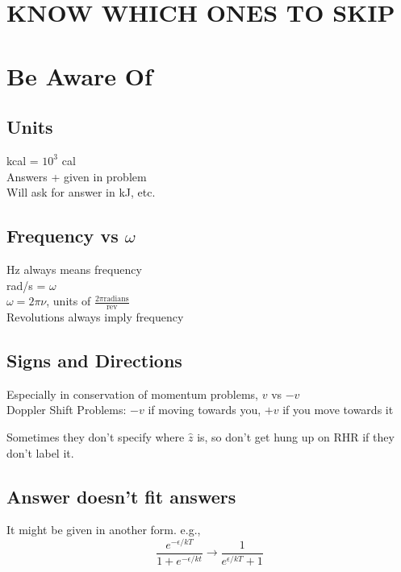 \documentclass[10pt,letter]{article}
\begin{document}
\section{KNOW WHICH ONES TO SKIP} %
\label{sec:know_which_ones_to_skip}

\section{Be Aware Of} %
\label{sec:units_to_be_aware_of}
\subsection{Units} %
\label{sub:units}
kcal = $10^3$ cal\\
Answers + given in problem\\
Will ask for answer in kJ, etc.

\subsection{Frequency vs $\omega$} %
\label{sub:freq}
Hz always means frequency\\
rad/s = $\omega$\\
$\omega = 2 \pi \nu$, units of $\frac{2\pi \textrm{radians} }{\textrm{rev}}$\\
Revolutions always imply frequency

\subsection{Signs and Directions} %
\label{sub:signs_and_directions}
Especially in conservation of momentum problems, $v$ vs $-v$\\
Doppler Shift Problems: $-v$ if moving towards you, $+v$ if you move towards it


Sometimes they don't specify where $\hat{z}$ is, so don't get hung up on RHR if they don't label it.\\
\subsection{Answer doesn't fit answers} %
\label{sub:answer_doesn_t_fit_answers}
It might be given in another form. e.g.,
\begin{equation}
    \frac{e^{-\epsilon/kT}}{1 + e^{-\epsilon/kt}} \rightarrow \frac{1}{e^{\epsilon/kT} + 1}
\end{equation}
\end{document}
